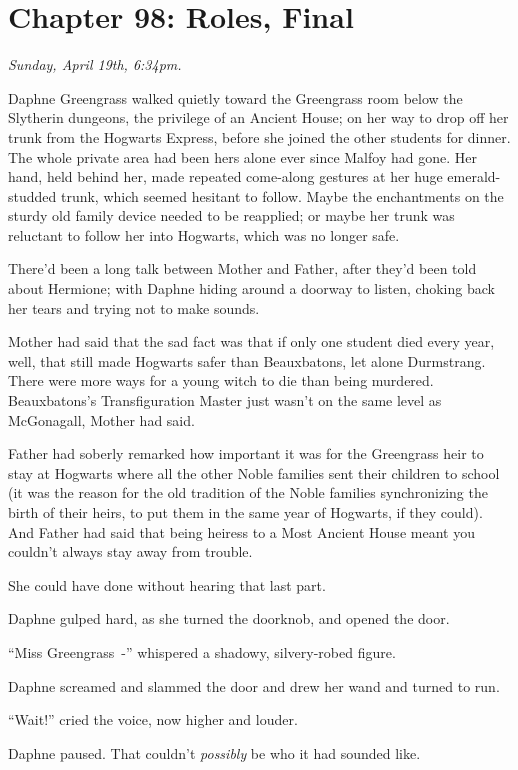 \chapter{Chapter 98: Roles, Final}
\emph{Sunday, April 19th, 6:34pm.}

Daphne Greengrass walked quietly toward the Greengrass room below the Slytherin dungeons, the privilege of an Ancient House; on her way to drop off her trunk from the Hogwarts Express, before she joined the other students for dinner. The whole private area had been hers alone ever since Malfoy had gone. Her hand, held behind her, made repeated come-along gestures at her huge emerald-studded trunk, which seemed hesitant to follow. Maybe the enchantments on the sturdy old family device needed to be reapplied; or maybe her trunk was reluctant to follow her into Hogwarts, which was no longer safe.

There'd been a long talk between Mother and Father, after they'd been told about Hermione; with Daphne hiding around a doorway to listen, choking back her tears and trying not to make sounds.

Mother had said that the sad fact was that if only one student died every year, well, that still made Hogwarts safer than Beauxbatons, let alone Durmstrang. There were more ways for a young witch to die than being murdered. Beauxbatons's Transfiguration Master just wasn't on the same level as McGonagall, Mother had said.

Father had soberly remarked how important it was for the Greengrass heir to stay at Hogwarts where all the other Noble families sent their children to school (it was the reason for the old tradition of the Noble families synchronizing the birth of their heirs, to put them in the same year of Hogwarts, if they could). And Father had said that being heiress to a Most Ancient House meant you couldn't always stay away from trouble.

She could have done without hearing that last part.

Daphne gulped hard, as she turned the doorknob, and opened the door.

``Miss Greengrass~-'' whispered a shadowy, silvery-robed figure.

Daphne screamed and slammed the door and drew her wand and turned to run.

``Wait!'' cried the voice, now higher and louder.

Daphne paused. That couldn't \emph{possibly} be who it had sounded like.

